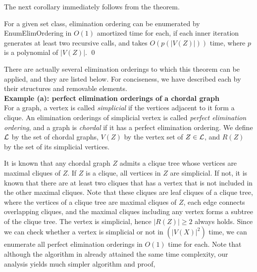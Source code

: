 \documentclass{llncs}
\begin{document}
The next corollary immediately follows from the theorem.

\begin{corollary}
For a given set class, elimination ordering can be enumerated 
 by EnumElimOrdering in $O(1)$ amortized time for each, if each
 inner iteration generates at least two recursive calls, and 
 takes $O(p(|V(Z)|))$ time, where $p$ is a polynomial of $|V(Z)|$. \qed
\end{corollary}

There are actually several elimination orderings to which this 
 theorem can be applied, and they are listed below.
For conciseness, we have described each by their structures and
 removable elements.\\

\vspace{-1mm}
{\bf Example (a): perfect elimination orderings of a chordal
 graph\cite{enumPEO}}\\
For a graph, a vertex is called {\em simplicial} if the vertices adjacent
 to it form a clique.
An elimination orderings of simplicial vertex is called {\em perfect
elimination ordering}\cite{elimord}, and a graph is {\em chordal}
 if it has a perfect elimination ordering.
We define $\cal L$ by the set of chordal graphs, $V(Z)$ by the vertex
 set of $Z\in {\cal L}$, and $R(Z)$ by the set of its simplicial vertices.

It is known that any chordal graph $Z$ admits a clique tree whose
 vertices are maximal cliques of $Z$.
If $Z$ is a clique, all vertices in $Z$ are simplicial.
If not, it is known that there are at least two cliques that has a vertex
 that is not included in the other maximal cliques.
Note that these cliques are leaf cliques of a clique tree, where 
 the vertices of a clique tree are maximal cliques of $Z$, 
 each edge connects overlapping cliques, and the maximal cliques 
 including any vertex forms a subtree of the clique tree.
The vertex is simplicial, hence $|R(Z)| \ge 2$ always holds.
Since we can check whether a vertex is simplicial or not in $(|V(X)|^2)$
 time, we can enumerate all perfect elimination orderings in $O(1)$
 time for each.
Note that although the algorithm in \cite{enumPEO} already attained the same 
 time complexity, our analysis yields much simpler algorithm and proof,
\\
\end{document}
